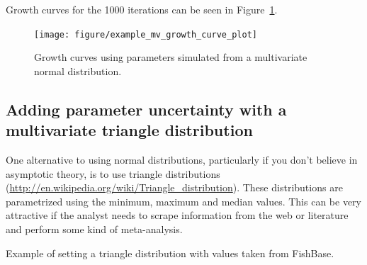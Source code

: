 \documentclass[a4paper,english,10pt]{article}\usepackage[]{graphicx}\usepackage[]{color}
\newenvironment{knitrout}{}{} %
\begin{document}
Growth curves for the 1000 iterations can be seen in Figure~\ref{fig:plot_mv_growth}.

\begin{figure}[h]
\begin{knitrout}
\color{fgcolor}

{\centering \texttt{[image: figure/example\_mv\_growth\_curve\_plot]} 

}



\end{knitrout}

\caption{Growth curves using parameters simulated from a multivariate normal distribution.}
\label{fig:plot_mv_growth}
\end{figure}

\subsection{Adding parameter uncertainty with a multivariate triangle distribution}
\label{sec:growth_triangle_cop}

One alternative to using normal distributions, particularly if you don't believe in asymptotic theory, is to use triangle distributions (\url{http://en.wikipedia.org/wiki/Triangle_distribution}). These distributions are parametrized using the minimum, maximum and median values. This can be very attractive if the analyst needs to scrape information from the web or literature and perform some kind of meta-analysis.

Example of setting a triangle distribution with values taken from FishBase.
\end{document}
